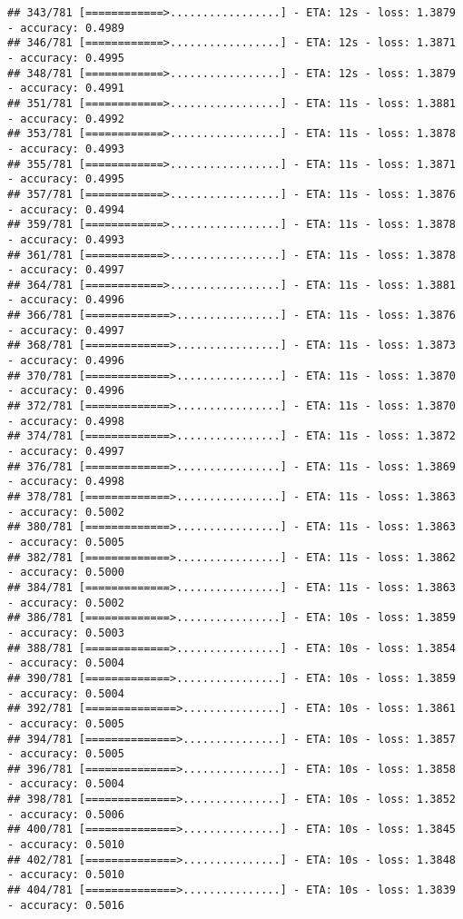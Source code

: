 \documentclass[
]{article}
\begin{document}
\begin{verbatim}
## 343/781 [============>.................] - ETA: 12s - loss: 1.3879 - accuracy: 0.4989
## 346/781 [============>.................] - ETA: 12s - loss: 1.3871 - accuracy: 0.4995
## 348/781 [============>.................] - ETA: 12s - loss: 1.3879 - accuracy: 0.4991
## 351/781 [============>.................] - ETA: 11s - loss: 1.3881 - accuracy: 0.4992
## 353/781 [============>.................] - ETA: 11s - loss: 1.3878 - accuracy: 0.4993
## 355/781 [============>.................] - ETA: 11s - loss: 1.3871 - accuracy: 0.4995
## 357/781 [============>.................] - ETA: 11s - loss: 1.3876 - accuracy: 0.4994
## 359/781 [============>.................] - ETA: 11s - loss: 1.3878 - accuracy: 0.4993
## 361/781 [============>.................] - ETA: 11s - loss: 1.3878 - accuracy: 0.4997
## 364/781 [============>.................] - ETA: 11s - loss: 1.3881 - accuracy: 0.4996
## 366/781 [=============>................] - ETA: 11s - loss: 1.3876 - accuracy: 0.4997
## 368/781 [=============>................] - ETA: 11s - loss: 1.3873 - accuracy: 0.4996
## 370/781 [=============>................] - ETA: 11s - loss: 1.3870 - accuracy: 0.4996
## 372/781 [=============>................] - ETA: 11s - loss: 1.3870 - accuracy: 0.4998
## 374/781 [=============>................] - ETA: 11s - loss: 1.3872 - accuracy: 0.4997
## 376/781 [=============>................] - ETA: 11s - loss: 1.3869 - accuracy: 0.4998
## 378/781 [=============>................] - ETA: 11s - loss: 1.3863 - accuracy: 0.5002
## 380/781 [=============>................] - ETA: 11s - loss: 1.3863 - accuracy: 0.5005
## 382/781 [=============>................] - ETA: 11s - loss: 1.3862 - accuracy: 0.5000
## 384/781 [=============>................] - ETA: 11s - loss: 1.3863 - accuracy: 0.5002
## 386/781 [=============>................] - ETA: 10s - loss: 1.3859 - accuracy: 0.5003
## 388/781 [=============>................] - ETA: 10s - loss: 1.3854 - accuracy: 0.5004
## 390/781 [=============>................] - ETA: 10s - loss: 1.3859 - accuracy: 0.5004
## 392/781 [==============>...............] - ETA: 10s - loss: 1.3861 - accuracy: 0.5005
## 394/781 [==============>...............] - ETA: 10s - loss: 1.3857 - accuracy: 0.5005
## 396/781 [==============>...............] - ETA: 10s - loss: 1.3858 - accuracy: 0.5004
## 398/781 [==============>...............] - ETA: 10s - loss: 1.3852 - accuracy: 0.5006
## 400/781 [==============>...............] - ETA: 10s - loss: 1.3845 - accuracy: 0.5010
## 402/781 [==============>...............] - ETA: 10s - loss: 1.3848 - accuracy: 0.5010
## 404/781 [==============>...............] - ETA: 10s - loss: 1.3839 - accuracy: 0.5016

\end{verbatim}
\end{document}
